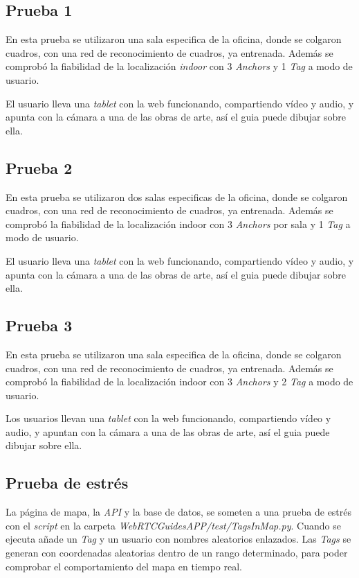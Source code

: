 \subsection{Prueba 1}
    En esta prueba se utilizaron una sala especifica de la oficina, donde se colgaron cuadros, con una red de reconocimiento de cuadros, ya entrenada. Además se comprobó la fiabilidad de la localización \textit{indoor} con 3 \textit{Anchors} y 1 \textit{Tag} a modo de usuario.
    
    El usuario lleva una \textit{tablet} con la web funcionando, compartiendo vídeo y audio, y apunta con la cámara a una de las obras de arte, así el guia puede dibujar sobre ella.
\subsection{Prueba 2}
    En esta prueba se utilizaron dos salas especificas de la oficina, donde se colgaron cuadros, con una red de reconocimiento de cuadros, ya entrenada. Además se comprobó la fiabilidad de la localización indoor con 3 \textit{Anchors} por sala y 1 \textit{Tag} a modo de usuario.
    
    El usuario lleva una \textit{tablet} con la web funcionando, compartiendo vídeo y audio, y apunta con la cámara a una de las obras de arte, así el guia puede dibujar sobre ella.
\subsection{Prueba 3}
    En esta prueba se utilizaron una sala especifica de la oficina, donde se colgaron cuadros, con una red de reconocimiento de cuadros, ya entrenada. Además se comprobó la fiabilidad de la localización indoor con 3 \textit{Anchors} y 2 \textit{Tag} a modo de usuario.
    
    Los usuarios llevan una \textit{tablet} con la web funcionando, compartiendo vídeo y audio, y apuntan con la cámara a una de las obras de arte, así el guia puede dibujar sobre ella.

\subsection{Prueba de estrés}
La página de mapa, la \textit{API} y la base de datos, se someten a una prueba de estrés con el \textit{script} en la carpeta \textit{WebRTCGuidesAPP/test/TagsInMap.py}. Cuando se ejecuta añade un \textit{Tag} y un usuario con nombres aleatorios enlazados. Las \textit{Tags} se generan con coordenadas aleatorias dentro de un rango determinado, para poder comprobar el comportamiento del mapa en tiempo real.